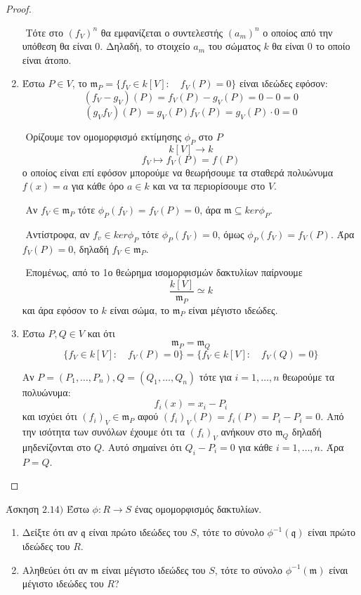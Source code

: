 \documentclass[oneside,a4paper]{article}
\begin{document}
\begin{proof}
\begin{enumerate}
		$ $\newline
		Τότε στο $(f_V)^n$ θα εμφανίζεται ο συντελεστής $(a_m)^n$ ο οποίος από την υπόθεση θα είναι $0$. Δηλαδή, το στοιχείο $a_m$ του σώματος $k$ θα είναι $0$ το οποίο είναι άτοπο.
		

		\item Έστω $P \in V$, το $\mathfrak{m}_P = \{f_V \in k[V]: \quad f_V (P) = 0 \}$ είναι ιδεώδες εφόσον:
		$$(f_V - g_V)(P) = f_V(P) - g_V (P) = 0 - 0 = 0$$
		$$(g_V f_V)(P) = g_V (P) f_V (P) = g_V (P) \cdot 0 = 0$$

		$ $\newline
		Ορίζουμε τον ομομορφισμό εκτίμησης $\phi_P$ στο $P$
		$$k[V]\longrightarrow k$$
		$$f_V \longmapsto f_V(P) = f(P)$$
		ο οποίος είναι επί εφόσον μπορούμε να θεωρήσουμε τα σταθερά πολυώνυμα $f(x) = a$ για κάθε όρο $a \in k$ και να τα περιορίσουμε στο $V$.

		$ $\newline
		Αν $f_V \in \mathfrak{m}_P$ τότε $\phi_P (f_V) = f_V (P) = 0$, άρα $\mathfrak{m} \subseteq ker\phi_P$.

		$ $\newline
		Αντίστροφα, αν $f_v \in ker\phi_P$ τότε $\phi_P (f_V) = 0$, όμως $\phi_P (f_V) = f_V(P)$. Άρα $f_V(P) = 0$, δηλαδή $f_V \in \mathfrak{m}_P$.

		$ $\newline
		Επομένως, από το 1ο θεώρημα ισομορφισμών δακτυλίων παίρνουμε
		$$\frac{k[V]}{\mathfrak{m}_P} \simeq k$$
		και άρα εφόσον το $k$ είναι σώμα, το $\mathfrak{m}_P$ είναι μέγιστο ιδεώδες.

		\item Έστω $P,Q \in V$ και ότι
		$$\mathfrak{m}_P = \mathfrak{m}_Q$$
		$$\{f_V \in k[V]: \quad f_V(P) = 0\} = \{f_V \in k[V]: \quad f_V(Q) = 0\}$$

		Αν $P = (P_1 ,\ldots, P_n), Q = (Q_1 ,\ldots, Q_n)$ τότε για $i=1,\ldots,n$ θεωρούμε τα πολυώνυμα:
		$$f_i (x) = x_i - P_i$$
		και ισχύει ότι $(f_i)_V \in \mathfrak{m}_P$ αφού $(f_i)_V (P) = f_i(P) = P_i - P_i = 0$. Από την ισότητα των συνόλων έχουμε ότι τα $(f_i)_V$ ανήκουν στο $\mathfrak{m}_Q$ δηλαδή μηδενίζονται στο $Q$. Αυτό σημαίνει ότι $Q_i - P_i = 0$ για κάθε $i=1,\ldots,n$. Άρα $P=Q$.
	\end{enumerate} 

\end{proof}



\pagebreak


\noindent Άσκηση $2.14)$
\quad Έστω $\phi : R \rightarrow S$ ένας ομομορφισμός δακτυλίων.
\begin{enumerate}
	\item Δείξτε ότι αν $\mathfrak{q}$ είναι πρώτο ιδεώδες του $S$, τότε το σύνολο $\phi^{-1} (\mathfrak{q})$ είναι πρώτο ιδεώδες του $R$.
	\item Αληθεύει ότι αν $\mathfrak{m}$ είναι μέγιστο ιδεώδες του $S$, τότε το σύνολο $\phi^{-1}(\mathfrak{m})$ είναι μέγιστο ιδεώδες του $R$?
\end{enumerate}
\end{document}
